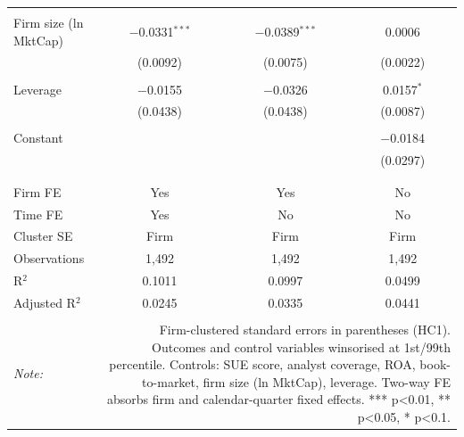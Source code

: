 \begin{table}[!htbp]
\begin{tabular}{@{\extracolsep{5pt}}lccc}
  & & & \\ 
 Firm size (ln MktCap) & $-$0.0331$^{***}$ & $-$0.0389$^{***}$ & 0.0006 \\ 
  & (0.0092) & (0.0075) & (0.0022) \\ 
  & & & \\ 
 Leverage & $-$0.0155 & $-$0.0326 & 0.0157$^{*}$ \\ 
  & (0.0438) & (0.0438) & (0.0087) \\ 
  & & & \\ 
 Constant &  &  & $-$0.0184 \\ 
  &  &  & (0.0297) \\ 
  & & & \\ 
\hline \\[-1.8ex] 
Firm FE & Yes & Yes & No \\ 
Time FE & Yes & No & No \\ 
Cluster SE & Firm & Firm & Firm \\ 
Observations & 1,492 & 1,492 & 1,492 \\ 
R$^{2}$ & 0.1011 & 0.0997 & 0.0499 \\ 
Adjusted R$^{2}$ & 0.0245 & 0.0335 & 0.0441 \\ 
\hline 
\hline \\[-1.8ex] 
\textit{Note:}  & \multicolumn{3}{r}{Firm-clustered standard errors in parentheses (HC1). Outcomes and control variables winsorised at 1st/99th percentile. Controls: SUE score, analyst coverage, ROA, book-to-market, firm size (ln MktCap), leverage. Two-way FE absorbs firm and calendar-quarter fixed effects. *** p<0.01, ** p<0.05, * p<0.1.} \\ 
\end{tabular} 
\end{table} 
